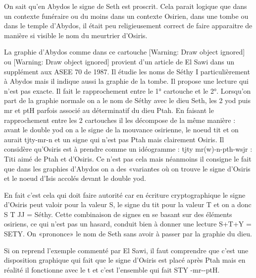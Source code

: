 \documentclass{article}
\begin{document}
On sait qu’en Abydos le signe de Seth est proscrit.  Cela parait logique
que dans un contexte funéraire ou du moins dans un contexte Osirien,
dans une tombe ou dans le temple d’Abydos, il était peu religieusement
correct de faire apparaitre de manière si visible le nom du meurtrier
d’Osiris.

La graphie d’Abydos comme dans ce cartouche [Warning: Draw object
ignored]  ou  [Warning: Draw object ignored]  provient d’un article de
El Sawi dans un supplément aux ASEE 70 de 1987. Il étudie les noms de
Séthy I particulièrement à Abydos mais il indique aussi la graphie de
la tombe. Il propose une lecture qui n’est pas exacte. Il fait le
rapprochement entre le 1° cartouche et le 2°. Lorsqu’on part de la
graphie normale on a le nom de Séthy avec le dieu Seth, les 2 yod puis
mr et ptH parfois associé au déterminatif du dieu Ptah. En faisant le
rapprochement entre les 2 cartouches il les  décompose de la même
manière : avant le double yod on a le signe de la mouvance osirienne,
le noeud tit et on aurait tjty-mr-n  et un signe qui n’est pas Ptah
mais clairement Osiris. Il considère qu’Osiris est à prendre comme un
idéogramme : tjty mr(w)-n-pth-wsjr : Titi aimé de Ptah et d’Osiris. Ce
n’est pas cela mais néanmoins il consigne le fait que dans les graphies
d’Abydos on a des «variantes où on trouve le signe d’Osiris et le noeud
d’Isis accolés  devant le double yod.

\begin{figure}[htp]

\end{figure}
\begin{figure}[htp]

\end{figure}
En fait c’est cela qui doit faire autorité car en écriture
cryptographique le signe d’Osiris peut valoir pour la valeur S, le
signe du tit pour la valeur T et on a donc S T JJ  = Séthy. Cette
combinaison de signes en se basant sur des éléments osiriens, ce qui
n’est pas un hasard, conduit bien à  donner une lecture S+T+Y = SETY.
On «prononce» le nom de Seth sans avoir à passer par la graphie du
dieu. 

Si on reprend l’exemple commenté par El Sawi, il faut comprendre que
c’est une disposition graphique qui fait que le signe d’Osiris est
placé après Ptah mais  en réalité il fonctionne avec le t et c’est
l’ensemble qui fait STY {}-mr-{}-ptH.
\end{document}
